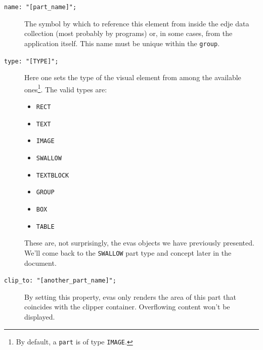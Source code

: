 \documentclass[a4paper]{profusion}
\begin{document}
\begin{description}
\item[\texttt{name: "[part\_name]";}] The symbol by which to reference
  this element from inside the edje data collection (most probably by
  programs) or, in some cases, from the application itself. This name
  must be unique within the \texttt{group}.

\item[\texttt{type: "[TYPE]";}] Here one sets the type of the visual
  element from among the available ones\footnote{By default, a
    \texttt{part} is of type \texttt{IMAGE}.}. The valid types are:
  \begin{itemize}
  \item \texttt{RECT}
  \item \texttt{TEXT}
  \item \texttt{IMAGE}
  \item \texttt{SWALLOW}
  \item \texttt{TEXTBLOCK}
  \item \texttt{GROUP}
  \item \texttt{BOX}
  \item \texttt{TABLE}
  \end{itemize}

These are, not surprisingly, the evas objects we have previously
presented.  We'll come back to the \texttt{SWALLOW} part type and
concept later in the document. %



\item[\texttt{clip\_to: "[another\_part\_name]";}] By setting this
  property, evas only renders the area of this part that coincides
  with the clipper container. Overflowing content won't be displayed.

\end{description}
\end{document}
